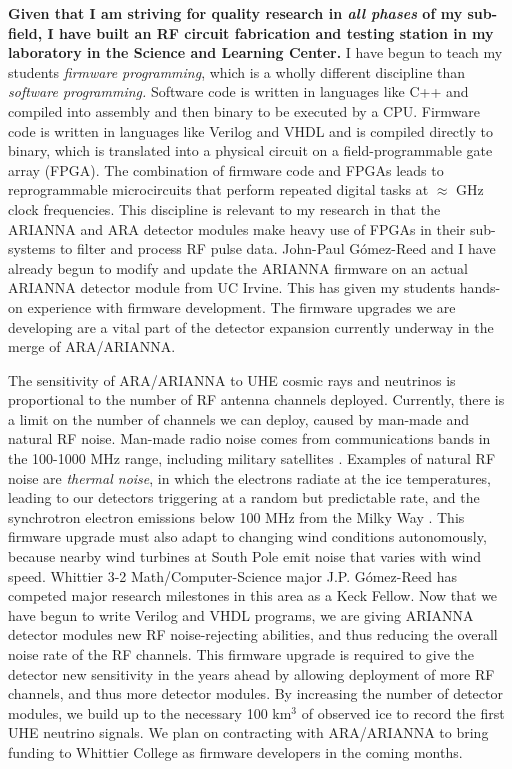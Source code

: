 \documentclass[../../main.tex]{subfiles}
\begin{document}
\textbf{Given that I am striving for quality research in \textit{all phases} of my sub-field, I have built an RF circuit fabrication and testing station in my laboratory in the Science and Learning Center.}  I have begun to teach my students \textit{firmware programming}, which is a wholly different discipline than \textit{software programming.}  Software code is written in languages like C++ and compiled into assembly and then binary to be executed by a CPU.  Firmware code is written in languages like Verilog and VHDL and is compiled directly to binary, which is translated into a physical circuit on a field-programmable gate array (FPGA).  The combination of firmware code and FPGAs leads to reprogrammable microcircuits that perform repeated digital tasks at $\approx$ GHz clock frequencies.  This discipline is relevant to my research in that the ARIANNA and ARA detector modules make heavy use of FPGAs in their sub-systems to filter and process RF pulse data.  John-Paul G\'{o}mez-Reed and I have already begun to modify and update the ARIANNA firmware on an actual ARIANNA detector module from UC Irvine.  This has given my students hands-on experience with firmware development.  The firmware upgrades we are developing are a vital part of the detector expansion currently underway in the merge of ARA/ARIANNA. \\ \hspace{0.1cm}

The sensitivity of ARA/ARIANNA to UHE cosmic rays and neutrinos is proportional to the number of RF antenna channels deployed.  Currently, there is a limit on the number of channels we can deploy, caused by man-made and natural RF noise.  Man-made radio noise comes from communications bands in the 100-1000 MHz range, including military satellites \cite{ALLISON201847}.  Examples of natural RF noise are \textit{thermal noise}, in which the electrons radiate at the ice temperatures, leading to our detectors triggering at a random but predictable rate, and the synchrotron electron emissions below 100 MHz from the Milky Way \cite{barwick2016radio}.  This firmware upgrade must also adapt to changing wind conditions autonomously, because nearby wind turbines at South Pole emit noise that varies with wind speed. Whittier 3-2 Math/Computer-Science major J.P. G\'{o}mez-Reed has competed major research milestones in this area as a Keck Fellow.  Now that we have begun to write Verilog and VHDL programs, we are giving ARIANNA detector modules new RF noise-rejecting abilities, and thus reducing the overall noise rate of the RF channels.  This firmware upgrade is required to give the detector new sensitivity in the years ahead by allowing deployment of more RF channels, and thus more detector modules.  By increasing the number of detector modules, we build up to the necessary 100 km$^3$ of observed ice to record the first UHE neutrino signals. We plan on contracting with ARA/ARIANNA to bring funding to Whittier College as firmware developers in the coming months.
\end{document}
